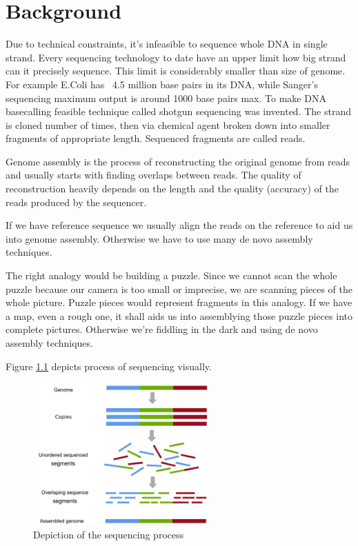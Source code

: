 \documentclass[times, utf8, diplomski, english]{fer}
\begin{document}
\chapter{Background}
\label{chap:background}
Due to technical constraints, it's infeasible  to sequence whole DNA in single strand. 
Every sequencing technology to date have an upper limit how big strand can it precisely sequence.
This limit is considerably smaller than size of genome.
For example E.Coli has ~4.5 million base pairs in its DNA, while Sanger's sequencing maximum output is around 1000 base pairs max.
To make DNA basecalling feasible technique called shotgun sequencing was invented. 
The strand is cloned number of times, then via chemical  agent broken down into smaller fragments of appropriate length. 
Sequenced fragments are called reads.

Genome assembly is the process of reconstructing the original genome from reads and usually starts with finding overlaps between reads.
The quality of reconstruction heavily depends on the length and the quality (accuracy) of the reads produced by the sequencer. 

If we have reference sequence we usually align the reads on the reference to aid us into genome assembly. Otherwise we have to use many de novo assembly techniques.

The right analogy would be building a puzzle. Since we cannot scan the whole puzzle because our camera is too small or imprecise, we are scanning pieces of the whole picture. Puzzle pieces would represent fragments in this analogy. If we have a map, even a rough one, it shall aids us into assemblying those puzzle pieces into complete pictures. Otherwise we're fiddling in the dark and using de novo assembly techniques.

Figure \ref{fg:sequencing} depicts process of sequencing visually.

\begin{figure}[!ht]
    \begin{center}
        \includegraphics[width=0.6\textwidth]{shotgun-sequencing}
        \caption{Depiction of the sequencing process}
        \label{fg:sequencing}
    \end{center}
\end{figure}
\end{document}
